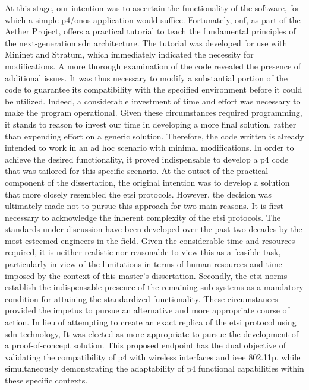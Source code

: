 At this stage, our intention was to ascertain the functionality of the software, for which a simple \gls{p4}/\gls{onos} application would suffice. Fortunately, \gls{onf}, as part of the Aether Project, offers a practical tutorial to teach the fundamental principles of the next-generation \gls{sdn} architecture. The tutorial was developed for use with Mininet and Stratum, which immediately indicated the necessity for modifications. A more thorough examination of the code revealed the presence of additional issues. It was thus necessary to modify a substantial portion of the code to guarantee its compatibility with the specified environment before it could be utilized. Indeed, a considerable investment of time and effort was necessary to make the program operational. Given these circumstances required programming, it stands to reason to invest our time in developing a more final solution, rather than expending effort on a generic solution. Therefore, the code written is already intended to work in an ad hoc scenario with minimal modifications.
In order to achieve the desired functionality, it proved indispensable to develop a \gls{p4} code that was tailored for this specific scenario. At the outset of the practical component of the dissertation, the original intention was to develop a solution that more closely resembled the \gls{etsi} protocols. However, the decision was ultimately made not to pursue this approach for two main reasons. It is first necessary to acknowledge the inherent complexity of the \gls{etsi} protocols. The standards under discussion have been developed over the past two decades by the most esteemed engineers in the field. Given the considerable time and resources required, it is neither realistic nor reasonable to view this as a feasible task, particularly in view of the limitations in terms of human resources and time imposed by the context of this master's dissertation. Secondly, the \gls{etsi} norms establish the indispensable presence of the remaining sub-systems as a mandatory condition for attaining the standardized functionality. These circumstances provided the impetus to pursue an alternative and more appropriate course of action. 
In lieu of attempting to create an exact replica of the \gls{etsi} protocol using \gls{sdn} technology, It was elected as more appropriate to pursue the development of a proof-of-concept solution. This proposed endpoint has the dual objective of validating the compatibility of \gls{p4} with wireless interfaces and \gls{ieee} 802.11p, while simultaneously demonstrating the adaptability of \gls{p4} functional capabilities within these specific contexts. 
